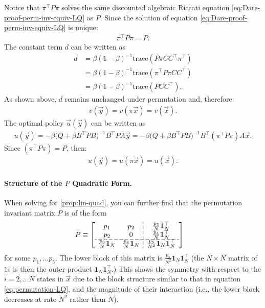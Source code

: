 \documentclass[12pt]{article}
\begin{document}
Notice that $\pi^\top P \pi$ solves the same discounted algebraic Riccati equation \cref{eq:Dare-proof-perm-inv-equiv-LQ} as $P$. Since the solution of equation \cref{eq:Dare-proof-perm-inv-equiv-LQ} is unique:
\begin{align*}
\pi^\top P \pi = P.
\end{align*} 
The constant term $d$ can be written as
\begin{align}
d & = \beta (1-\beta)^{-1}\text{trace}(P\pi C C^\top\pi^\top) \nonumber \\
   & = \beta (1-\beta)^{-1}\text{trace}(\pi^\top P\pi C C^\top) \nonumber \\
   & = \beta (1-\beta)^{-1}\text{trace}( P C C^\top).
\end{align} 
As shown above, $d$ remains unchanged under permutation and, therefore:
\begin{align*}
v(\vec{y}) = v(\pi\vec{x}) = v(\vec{x}). 
\end{align*}
The optimal policy $\vec{u}(\vec{y})$ can be written as
\begin{align*}
u(\vec{y}) = -\beta \big(Q+\beta B^\top P B\big)^{-1} B^\top P A \vec{y} = - \beta \big(Q+\beta B^\top P B\big)^{-1} B^\top (\pi^\top P\pi) A \vec{x}.
\end{align*}
Since $(\pi^\top P\pi) = P$, then:
\begin{align*}
u(\vec{y}) = u(\pi\vec{x}) = u(\vec{x}).
\end{align*}

\paragraph{Structure of the $P$ Quadratic Form.} When solving for \cref{prop:lin-quad}, you can further find that the  permutation invariant matrix $P$ is of the form
\begin{align}
P &\equiv \left[\begin{array}{cc;{5pt/2 pt}c}
p_1 & p_2 & \frac{p_3}{N}\mathbf{1}_N^{\top}\\
p_2 & 0 & \frac{p_4}{N}\mathbf{1}_N^{\top}\\
\hdashline[5pt/2 pt]
\frac{p_3}{N} \mathbf{1}_N &  \frac{p_4}{N}\mathbf{1}_N & \frac{p_5}{N^2} \mathbf{1}_N \mathbf{1}_N^{\top}
\end{array}\right]\label{eq:P}
\end{align}
for some $p_1, \ldots p_5$. The lower block of this matrix is $\frac{p_5}{N^2}\mathbf{1}_N\mathbf{1}_N^{\top}$ (the $N \times N$ matrix of $1$s is then the outer-product $\mathbf{1}_N\mathbf{1}_N^{\top}$.) This shows the symmetry with respect to the $i= 2, \ldots N$ states in $\vec{x}$ due to the block structure similar to that in equation \cref{eq:permutation-LQ}, and the magnitude of their interaction (i.e., the lower block  decreases at rate $N^2$ rather than $N$).
\end{document}
